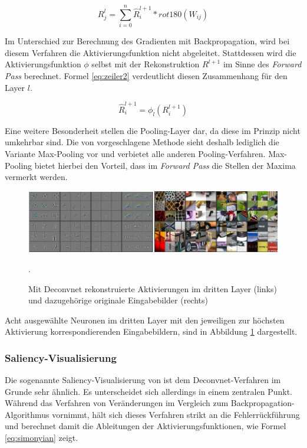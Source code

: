 \begin{equation}
\label{eq:zeiler1}
R^l_j = \sum_{i = 0}^{n} \hat{R}^{l+1}_{i} \ast rot180(W_{ij})
\end{equation}

Im Unterschied zur Berechnung des Gradienten mit Backpropagation, wird bei diesem Verfahren die Aktivierungsfunktion nicht abgeleitet. Stattdessen wird die Aktivierungsfunktion $\phi$ selbst mit der Rekonstruktion $R^{l+1}$ im Sinne des \textit{Forward Pass} berechnet. Formel \ref{eq:zeiler2} verdeutlicht diesen Zusammenhang für den Layer $l$.

\begin{equation}
\label{eq:zeiler2}
\hat{R}^{l+1}_i = \phi_l(R^{l+1}_i)
\end{equation}

Eine weitere Besonderheit stellen die Pooling-Layer dar, da diese im Prinzip nicht umkehrbar sind. Die von \cite{Zeiler2014} vorgeschlagene Methode sieht deshalb lediglich die Variante Max-Pooling vor und verbietet alle anderen Pooling-Verfahren. Max-Pooling bietet hierbei den Vorteil, dass im \textit{Forward Pass} die Stellen der Maxima vermerkt werden.

\begin{figure}
\centering
\includegraphics[width=0.9\linewidth]{images/4_zeiler}
\caption[]{Mit Deconvnet rekonstruierte Aktivierungen im dritten Layer (links) und dazugehörige originale Eingabebilder (rechts) \cite[siehe][]{Zeiler2014}}.
\label{fig:4_zeiler}
\end{figure}

Acht ausgewählte Neuronen im dritten Layer mit den jeweiligen zur höchsten Aktivierung korrespondierenden Eingabebildern, sind in Abbildung \ref{fig:4_zeiler} dargestellt.

\subsubsection{Saliency-Visualisierung}
Die sogenannte Saliency-Visualisierung von \cite{Simonyan2013} ist dem Deconvnet-Verfahren im Grunde sehr ähnlich. Es unterscheidet sich allerdings in einem zentralen Punkt. 
Während das Verfahren von \cite{Zeiler2014} Veränderungen im Vergleich zum Backpropagation-Algorithmus vornimmt, hält sich dieses Verfahren strikt an die Fehlerrückführung und berechnet damit die Ableitungen der Aktivierungsfunktionen, wie Formel \ref{eq:simonyian} zeigt. 

